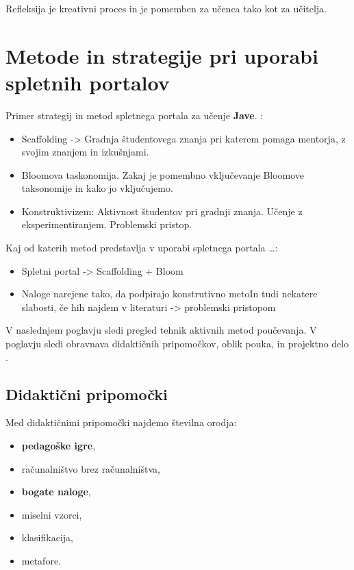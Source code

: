 Refleksija je kreativni proces in je pomemben za učenca tako kot za
učitelja.

\section{Metode in strategije pri uporabi spletnih portalov}
\label{sec:Metode_in_strategije_pri_učenju_programiranja}

Primer strategij in metod spletnega portala za učenje \textbf{Jave}.
\cite{thesisAWebP}:

\begin{itemize}
\item
  Scaffolding -\textgreater{} Gradnja študentovega znanja
  pri katerem pomaga mentorja, z svojim znanjem in izkušnjami.
\item
  Bloomova taskonomija. Zakaj je pomembno vključevanje Bloomove
  taksonomije in kako jo vključujemo.
\item
  Konstruktivizem: Aktivnost študentov pri gradnji znanja. Učenje z
  eksperimentiranjem. Problemski pristop.
\end{itemize}

Kaj od katerih metod predstavlja v uporabi spletnega portala \ldots{}:

\begin{itemize}
\item
  Spletni portal -\textgreater{} Scaffolding + Bloom
\item
  Naloge narejene tako, da podpirajo konstrutivno metoIn tudi nekatere slabosti, če hih najdem v literaturi
  -\textgreater{} problemski pristopom
\end{itemize}


V naslednjem poglavju sledi pregled tehnik aktivnih metod
poučevanja. V poglavju sledi obravnava didaktičnih pripomočkov, oblik
pouka, in projektno delo \cite{guideTCS}.
\subsection{Didaktični pripomočki}
\label{sec:didaktični_pripomočki}

Med didaktičnimi pripomočki najdemo številna orodja:

\begin{itemize}
\item \textbf{pedagoške igre},
\item računalništvo brez računalništva,
\item \textbf{bogate naloge},
\item miselni vzorci,
\item klasifikacija,
\item metafore.
\end{itemize}

